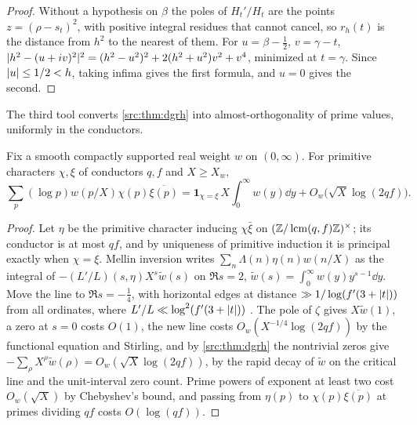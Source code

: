 \begin{proof}
Without a hypothesis on $\beta$ the poles of $H_t'/H_t$ are the points $z=(\rho-s_t)^2$, with
positive integral residues that cannot cancel, so $r_h(t)$ is the distance from $h^2$ to the
nearest of them. For $u=\beta-\tfrac12$, $v=\gamma-t$,
$\lvert h^2-(u+iv)^2\rvert^2=(h^2-u^2)^2+2(h^2+u^2)v^2+v^4$, minimized at $t=\gamma$. Since
$\lvert u\rvert\le1/2<h$, taking infima gives the first formula, and $u=0$ gives the second.
\end{proof}

The third tool converts \cref{src:thm:dgrh} into almost-orthogonality of prime values, uniformly in the
conductors.

\begin{lemma}\label{rec:lem:gram}
Fix a smooth compactly supported real weight $w$ on $(0,\infty)$. For primitive characters $\chi,\xi$ of
conductors $q,f$ and $X\ge X_w$,
\[
 \sum_p(\log p)w(p/X)\chi(p)\overline{\xi(p)}=\mathbf 1_{\chi=\xi}\,X\int_0^\infty w(y)\dd y+O_w\bigl(\sqrt X\log(2qf)\bigr).
\]
\end{lemma}

\begin{proof}
Let $\eta$ be the primitive character inducing $\chi\bar\xi$ on $(\mathbb{Z}/\operatorname{lcm}(q,f)\mathbb{Z})^\times$; its conductor is at most
$qf$, and by uniqueness of primitive induction it is principal exactly when $\chi=\xi$. Mellin
inversion writes $\sum_n\Lambda(n)\eta(n)w(n/X)$ as the integral of $-(L'/L)(s,\eta)X^s\widetilde w(s)$ on $\Re s=2$,
$\widetilde w(s)=\int_0^\infty w(y)y^{s-1}\dd y$. Move the line to $\Re s=-\tfrac14$, with horizontal edges at
distance $\gg1/\log(f'(3+\lvert t\rvert))$ from all ordinates, where $L'/L\ll\log^2(f'(3+\lvert t\rvert))$ \cite{Davenport2000Multiplicative}.
The pole of $\zeta$ gives $X\widetilde w(1)$, a zero at $s=0$ costs $O(1)$, the new line costs
$O_w(X^{-1/4}\log(2qf))$ by the functional equation and Stirling, and by \cref{src:thm:dgrh} the
nontrivial zeros give $-\sum_\rho X^\rho\widetilde w(\rho)=O_w(\sqrt X\log(2qf))$, by the rapid decay of $\widetilde w$ on
the critical line and the unit-interval zero count. Prime powers of exponent at least two cost
$O_w(\sqrt X)$ by Chebyshev's bound, and passing from $\eta(p)$ to $\chi(p)\overline{\xi(p)}$ at primes dividing
$qf$ costs $O(\log(qf))$.
\end{proof}

